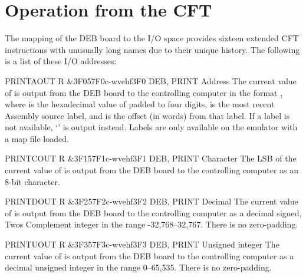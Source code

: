 
\section{Operation from the CFT}

The mapping of the \gls{DEB} board to the I/O space provides sixteen
extended CFT instructions with unusually long names due to their
unique history. The following is a list of these I/O addresses:

\begin{extcmd}{PRINTA}{OUT R \&3F0}{57F0}{c-wvehf}{3F0}%
       {DEB, PRINT Address}%
       {%
         The current value of \A{} is output from the
         \gls{DEB} board to the controlling computer in the format
         , where  is the hexadecimal
         value of \A{} padded to four digits,  is the most
         recent \gls{Assembly} source label, and  is the offset (in
         words) from that label. If a label is not available, ‘’ is output instead. Labels are only available on the emulator
         with a map file loaded.%
       }
\end{extcmd}

\begin{extcmd}{PRINTC}{OUT R \&3F1}{57F1}{c-wvehf}{3F1}%
       {DEB, PRINT Character}%
       {%
         The \gls{LSB} of the current value of \A{} is output from the
         \gls{DEB} board to the controlling computer as an 8-bit
         character.
       }
\end{extcmd}

\begin{extcmd}{PRINTD}{OUT R \&3F2}{57F2}{c-wvehf}{3F2}%
       {DEB, PRINT Decimal}%
       {%
         The current value of \A{} is output from the \gls{DEB} board to the
         controlling computer as a decimal signed, \gls{Twos Complement}
         integer in the range -32,768–32,767. There is no zero-padding.
       }
\end{extcmd}

\begin{extcmd}{PRINTU}{OUT R \&3F3}{57F3}{c-wvehf}{3F3}%
       {DEB, PRINT Unsigned integer}%
       {%
         The current value of \A{} is output from the \gls{DEB} board to the
         controlling computer as a decimal unsigned integer in the range
         0–65,535. There is no zero-padding.
       }
\end{extcmd}

